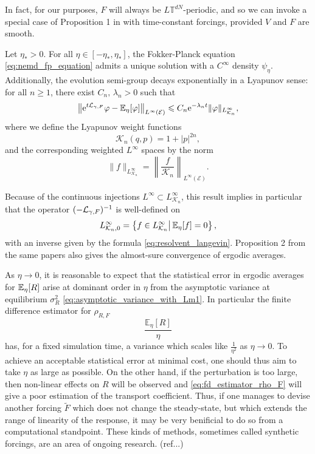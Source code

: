 In fact, for our purposes, $F$ will always be $L\mathbb{T}^{dN}$-periodic, and so we can invoke a special case of Proposition 1 in \cite{JPS15} with time-constant forcings, provided $V$ and $F$ are smooth.
\begin{theorem}\label{thm:nemd_exst_invariant_measure}
    Let $\eta_*>0$. For all $\eta\in[-\eta_*,\eta_*]$, the Fokker-Planck equation \eqref{eq:nemd_fp_equation} admits a unique solution with a $C^\infty$ density $\psi_\eta$.
    Additionally, the evolution semi-group decays exponentially in a Lyapunov sense: for all $n\geq 1$, there exist $C_n,\,\lambda_n>0$ such that
    \begin{equation}
        \label{eq:lyapunov_exp_decay}
        \left\|\mathrm{e}^{t\mathcal{L}_{\gamma,F}}\varphi-\mathbb{E}_\eta[\varphi]\right\|_{L^{\infty}(\mathcal E)}\leqslant C_n\mathrm{e}^{-\lambda_n t}\|\varphi\|_{L^\infty_{\mathcal K_n}},
    \end{equation}
    where we define the Lyapunov weight functions
    \[\mathcal K_n(q,p)=1+|p|^{2n},\]
    and the corresponding weighted $L^{\infty}$ spaces by the norm
    \[\|f\|_{L^\infty_{\mathcal K_n}}=\left\|\frac{f}{\mathcal K_n}\right\|_{L^\infty(\mathcal E)}.\]
\end{theorem}
Because of the continuous injections $L^\infty \subset L^\infty_{\mathcal K_n}$, this result implies in particular that the operator 
$(-\mathcal{L}_{\gamma,F})^{-1}$ is well-defined on 
\[L^\infty_{\mathcal K_n,0}=\left\{f\in L^\infty_{\mathcal K_n}\middle|\,\mathbb{E}_\eta[f]=0\right\},\]
with an inverse given by the formula \eqref{eq:resolvent_langevin}. Proposition 2 from the same papers also gives the almost-sure convergence of ergodic averages.
 \begin{remark}\label{rem:linear_regime}
    As $\eta \to 0$, it is reasonable to expect that the statistical error in ergodic averages for
    $\mathbb{E}_\eta[R]$ arise at dominant order in $\eta$ from the asymptotic variance at equilibrium $\sigma^2_R$ \eqref{eq:asymptotic_variance_with_Lm1}.
    In particular the finite difference estimator for $\rho_{R,F}$
    \begin{equation}
        \label{eq:fd_estimator_rho_F}
        \frac{\mathbb{E}_\eta[R]}{\eta}
    \end{equation}
    has, for a fixed simulation time, a variance which scales like $\frac1{\eta^2}$ as $\eta\to 0$.
    To achieve an acceptable statistical error at minimal cost, one should thus aim to take $\eta$ as large as possible.
    On the other hand, if the perturbation is too large, then non-linear effects on $R$ will be observed and \eqref{eq:fd_estimator_rho_F} 
    will give a poor estimation of the transport coefficient.
    Thus, if one manages to devise another forcing $\tilde F$ which does not change the steady-state, but which extends the range of linearity of the response,
    it may be very benificial to do so from a computational standpoint. These kinds of methods, sometimes called synthetic forcings, are an area of ongoing research. (ref...)
 \end{remark}
